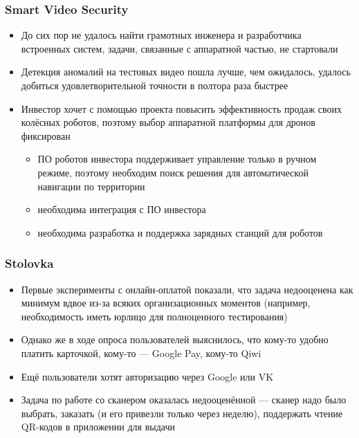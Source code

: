 \documentclass[xetex,mathserif,serif]{beamer}
\begin{document}
	\begin{frame}
		\frametitle{Smart Video Security}
		\begin{itemize}
			\item До сих пор не удалось найти грамотных инженера и разработчика встроенных систем, задачи, связанные с аппаратной частью, не стартовали
			\item Детекция аномалий на тестовых видео пошла лучше, чем ожидалось, удалось добиться удовлетворительной точности в полтора раза быстрее
			\item Инвестор хочет с помощью проекта повысить эффективность продаж своих колёсных роботов, поэтому выбор аппаратной платформы для дронов фиксирован
			\begin{itemize}
				\item ПО роботов инвестора поддерживает управление только в ручном режиме, поэтому необходим поиск решения для автоматической навигации по территории
				\item необходима интеграция с ПО инвестора
				\item необходима разработка и поддержка зарядных станций для роботов
			\end{itemize}
		\end{itemize}
	\end{frame}

	\begin{frame}
		\frametitle{Stolovka}
		\begin{itemize}
			\item Первые эксперименты с онлайн-оплатой показали, что задача недооценена как минимум вдвое из-за всяких организационных моментов (например, необходимость иметь юрлицо для полноценного тестирования)
			\item Однако же в ходе опроса пользователей выяснилось, что кому-то удобно платить карточкой, кому-то --- Google Pay, кому-то Qiwi
			\item Ещё пользователи хотят авторизацию через Google или VK
			\item Задача по работе со сканером оказалась недооценённой --- сканер надо было выбрать, заказать (и его привезли только через неделю), поддержать чтение QR-кодов в приложении для выдачи
		\end{itemize}
	\end{frame}
\end{document}
